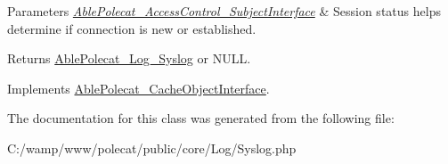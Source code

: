 \begin{DoxyParams}{Parameters}
{\em \hyperlink{interface_able_polecat___access_control___subject_interface}{Able\+Polecat\+\_\+\+Access\+Control\+\_\+\+Subject\+Interface}} & Session status helps determine if connection is new or established.\\
\hline
\end{DoxyParams}
\begin{DoxyReturn}{Returns}
\hyperlink{class_able_polecat___log___syslog}{Able\+Polecat\+\_\+\+Log\+\_\+\+Syslog} or N\+U\+L\+L. 
\end{DoxyReturn}


Implements \hyperlink{interface_able_polecat___cache_object_interface_a3f2135f6ad45f51d075657f6d20db2cd}{Able\+Polecat\+\_\+\+Cache\+Object\+Interface}.



The documentation for this class was generated from the following file\+:\begin{DoxyCompactItemize}
\item 
C\+:/wamp/www/polecat/public/core/\+Log/Syslog.\+php\end{DoxyCompactItemize}
